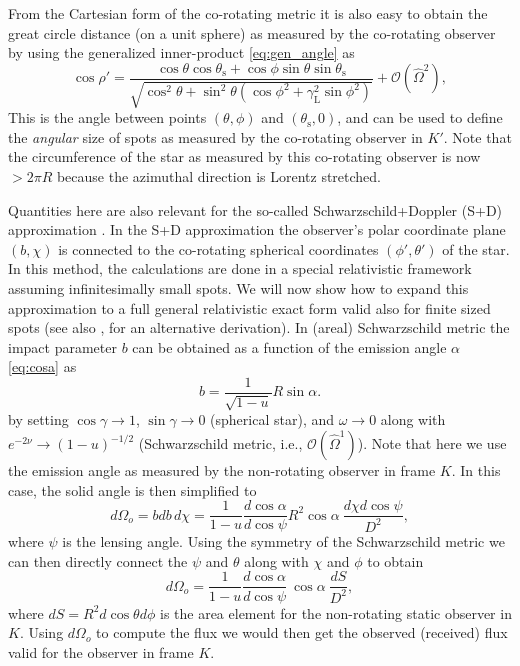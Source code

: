 \documentclass{aa}
\newcommand{\be}{\begin{equation}}
\newcommand{\ee}{\end{equation}}
\newcommand{\sch}{Schwarzschild }
\newcommand{\Ob}{\ensuremath{\hat{\Omega}}}
\newcommand{\lgamma}{\gamma_{\text{L}}}
\begin{document}
From the Cartesian form of the co-rotating metric it is also easy to obtain the great circle distance (on a unit sphere) as measured by the co-rotating observer by using the generalized inner-product \eqref{eq:gen_angle} as
\be\label{eq:rel_cos}
\cos\rho' = \frac{\cos\theta \cos\theta_\mathrm{s} + \cos\phi \sin\theta \sin\theta_{\mathrm{s}}}{\sqrt{ \cos^2\theta + \sin^2\theta (\cos\phi^2 + \lgamma^2 \sin\phi^2)}} + \mathcal{O}(\Ob^2),
\ee
This is the angle between points $(\theta, \phi)$ and $(\theta_{\mathrm{s}}, 0)$, and can be used to define the \textit{angular} size of spots as measured by the co-rotating observer in $K'$.
Note that the circumference of the star as measured by this co-rotating observer is now $>2\pi R$ because the azimuthal direction is Lorentz stretched.

Quantities here are also relevant for the so-called Schwarzschild+Doppler (S+D) approximation \cite[see e.g.,][]{PB06}.
In the S+D approximation the observer's polar coordinate plane $(b,\chi)$ is connected to the co-rotating spherical coordinates $(\phi', \theta')$ of the star.
In this method, the calculations are done in a special relativistic framework assuming infinitesimally small spots.
We will now show how to expand this approximation to a full general relativistic exact form valid also for finite sized spots (see also \citealt{CML07}, for an alternative derivation).
In (areal) \sch metric the impact parameter $b$ can be obtained as a function of the emission angle $\alpha$ \eqref{eq:cosa} as
\be
b = \frac{1}{\sqrt{1-u}} R \sin\alpha.
\ee
by setting $\cos\gamma \rightarrow 1$, $\sin\gamma \rightarrow 0$ (spherical star), and $\omega \rightarrow 0$ along with $e^{-2\nu} \rightarrow (1-u)^{-1/2}$ (\sch metric, i.e., $\mathcal{O}(\Ob^1)$).
Note that here we use the emission angle as measured by the non-rotating observer in frame $K$.
In this case, the solid angle is then simplified to 
\be
d\Omega_o = bdb \, d\chi = \frac{1}{1-u} \frac{d \cos\alpha}{d \cos\psi} R^2 \cos\alpha ~ \frac{d\chi d\cos\psi}{D^2},
\ee
where $\psi$ is the lensing angle.
Using the symmetry of the \sch metric we can then directly connect the $\psi$ and $\theta$ along with $\chi$ and $\phi$ to obtain
\be
d\Omega_o = \frac{1}{1-u} \frac{d \cos\alpha}{d \cos\psi} ~\cos\alpha ~ \frac{dS}{D^2},
\ee
where $dS = R^2 d\cos\theta d\phi$ is the area element for the non-rotating static observer in $K$.
Using $d\Omega_o$ to compute the flux we would then get the observed (received) flux valid for the observer in frame $K$.
\end{document}
